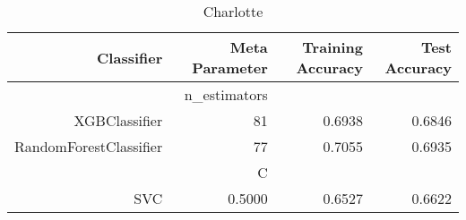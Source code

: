 
\begin{table}[H]
    \caption{Charlotte}
    \centering
    \begin{tabular}{|r|r|r|r|}
        \hline
        Classifier &Meta Parameter &Training Accuracy
        &Test Accuracy\\
        \hline
        &n\_estimators &\multicolumn{2}{|r|}{}\\
        \hline
        XGBClassifier &81 &0.6938 &0.6846\\
        \hline
        RandomForestClassifier &77 &0.7055 &0.6935\\
        \hline
        &C &\multicolumn{2}{|r|}{}\\
        \hline
        SVC &0.5000 &0.6527 &0.6622\\
        \hline
    \end{tabular}
\end{table}
